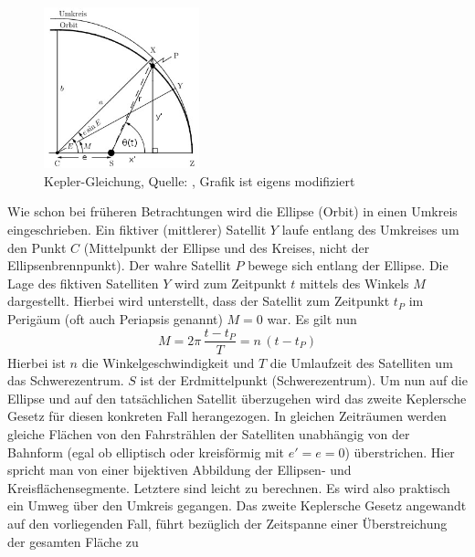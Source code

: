 \begin{figure}[h]                                                                           %
	\centering                                                                            	%
	\includegraphics[width=0.4\textwidth]{./images/keplers_equation.jpg}                    %
	\caption[Kepler-Gleichung]{Kepler-Gleichung, Quelle: \cite{Wiki:KeplerGl}, 
								Grafik ist eigens modifiziert}              				%
	\label{fig:kepler_gl}                                                                	%
\end{figure}                                                                              	%
Wie schon bei früheren Betrachtungen wird die Ellipse (Orbit) in einen Umkreis eingeschrieben. Ein fiktiver (mittlerer) Satellit \ensuremath{Y} laufe entlang des Umkreises um den Punkt \ensuremath{C} (Mittelpunkt der Ellipse und des Kreises, nicht der Ellipsenbrennpunkt). Der wahre Satellit \ensuremath{P} bewege sich entlang der Ellipse. Die Lage des fiktiven Satelliten \ensuremath{Y} wird zum Zeitpunkt \ensuremath{t} mittels des Winkels \ensuremath{M} dargestellt. Hierbei wird unterstellt, dass der Satellit zum Zeitpunkt \ensuremath{t_P} im Perigäum (oft auch Periapsis genannt) \ensuremath{M=0} war. Es gilt nun
\begin{equation}
	M=2\pi\,\frac{t-t_P}{T}=n\,(t-t_P)
\end{equation}   
Hierbei ist \ensuremath{n} die Winkelgeschwindigkeit und \ensuremath{T} die Umlaufzeit des Satelliten um das Schwerezentrum. \ensuremath{S} ist der Erdmittelpunkt (Schwerezentrum). 
Um nun auf die Ellipse und auf den tatsächlichen Satellit überzugehen wird das zweite Keplersche Gesetz für diesen konkreten Fall herangezogen. In gleichen Zeiträumen werden gleiche Flächen von den Fahrstrählen der Satelliten unabhängig von der Bahnform (egal ob elliptisch oder kreisförmig mit \ensuremath{e'=e=0}) überstrichen. Hier spricht man von einer bijektiven Abbildung der Ellipsen- und Kreisflächensegmente. Letztere sind leicht zu berechnen. Es wird also praktisch ein Umweg über den Umkreis gegangen. Das zweite Keplersche Gesetz angewandt auf den vorliegenden Fall, führt bezüglich der Zeitspanne einer Überstreichung der gesamten Fläche zu
